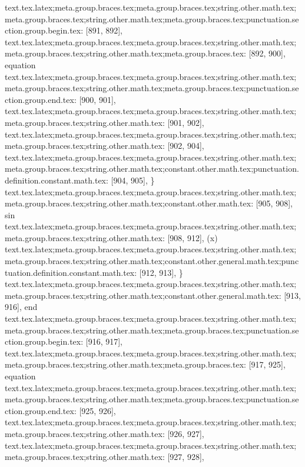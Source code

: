 {{{{{{{{{{{{{{{{{{{{{{{{{{{text.tex.latex;meta.group.braces.tex;meta.group.braces.tex;string.other.math.tex;meta.group.braces.tex;string.other.math.tex;meta.group.braces.tex;punctuation.section.group.begin.tex: [891, 892], {{}
text.tex.latex;meta.group.braces.tex;meta.group.braces.tex;string.other.math.tex;meta.group.braces.tex;string.other.math.tex;meta.group.braces.tex: [892, 900], {equation}
text.tex.latex;meta.group.braces.tex;meta.group.braces.tex;string.other.math.tex;meta.group.braces.tex;string.other.math.tex;meta.group.braces.tex;punctuation.section.group.end.tex: [900, 901], {}}
text.tex.latex;meta.group.braces.tex;meta.group.braces.tex;string.other.math.tex;meta.group.braces.tex;string.other.math.tex: [901, 902], {
}
text.tex.latex;meta.group.braces.tex;meta.group.braces.tex;string.other.math.tex;meta.group.braces.tex;string.other.math.tex: [902, 904], {  }
text.tex.latex;meta.group.braces.tex;meta.group.braces.tex;string.other.math.tex;meta.group.braces.tex;string.other.math.tex;constant.other.math.tex;punctuation.definition.constant.math.tex: [904, 905], {\}
text.tex.latex;meta.group.braces.tex;meta.group.braces.tex;string.other.math.tex;meta.group.braces.tex;string.other.math.tex;constant.other.math.tex: [905, 908], {sin}
text.tex.latex;meta.group.braces.tex;meta.group.braces.tex;string.other.math.tex;meta.group.braces.tex;string.other.math.tex: [908, 912], {(x)
}
text.tex.latex;meta.group.braces.tex;meta.group.braces.tex;string.other.math.tex;meta.group.braces.tex;string.other.math.tex;constant.other.general.math.tex;punctuation.definition.constant.math.tex: [912, 913], {\}
text.tex.latex;meta.group.braces.tex;meta.group.braces.tex;string.other.math.tex;meta.group.braces.tex;string.other.math.tex;constant.other.general.math.tex: [913, 916], {end}
text.tex.latex;meta.group.braces.tex;meta.group.braces.tex;string.other.math.tex;meta.group.braces.tex;string.other.math.tex;meta.group.braces.tex;punctuation.section.group.begin.tex: [916, 917], {{}
text.tex.latex;meta.group.braces.tex;meta.group.braces.tex;string.other.math.tex;meta.group.braces.tex;string.other.math.tex;meta.group.braces.tex: [917, 925], {equation}
text.tex.latex;meta.group.braces.tex;meta.group.braces.tex;string.other.math.tex;meta.group.braces.tex;string.other.math.tex;meta.group.braces.tex;punctuation.section.group.end.tex: [925, 926], {}}
text.tex.latex;meta.group.braces.tex;meta.group.braces.tex;string.other.math.tex;meta.group.braces.tex;string.other.math.tex: [926, 927], {
}
text.tex.latex;meta.group.braces.tex;meta.group.braces.tex;string.other.math.tex;meta.group.braces.tex;string.other.math.tex: [927, 928], {
}}}}}}}}}}}}}}}}}}}}}}}}}}}}}}
